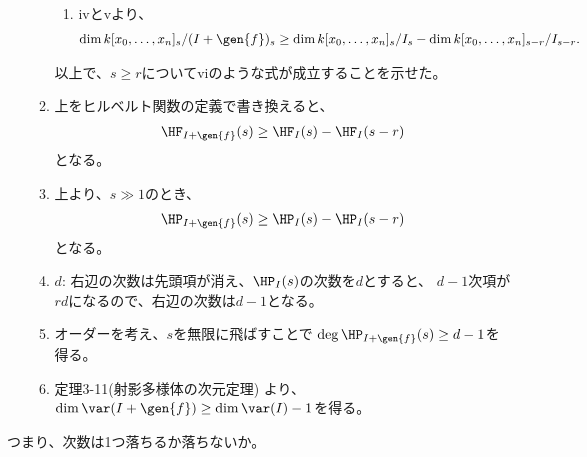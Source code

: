 \begin{myproof}
\begin{enumerate}
\begin{enumerate}
\begin{enumerate}
        \item
        ivとvより、
        \begin{align}
          \dim k[x_0,\dots,x_n]_s/(I+\gen{f})_s
          \ge
          \dim k[x_0,\dots,x_n]_s/I_s - \dim k[x_0,\dots,x_n]_{s-r}/I_{s-r}.
        \end{align}
      \end{enumerate}
      以上で、$s\ge r$についてviのような式が成立することを示せた。
      \item
      上をヒルベルト関数の定義で書き換えると、
      \begin{align}
        \HF_{I+\gen{f}}(s)\ge
        \HF_{I}(s) - \HF_{I}(s-r)
      \end{align}
      となる。
      \item
      上より、$s\gg 1$のとき、
      \begin{align}
        \HP_{I+\gen{f}}(s)
        \ge
        \HP_I(s) - \HP_I(s-r)
      \end{align}
      となる。
      \item
      $d$:
      右辺の次数は先頭項が消え、$\HP_I(s)$の次数を$d$とすると、
      $d-1$次項が$rd$になるので、右辺の次数は$d-1$となる。
      \item
      オーダーを考え、$s$を無限に飛ばすことで
      $\deg \HP_{I+\gen{f}}(s) \ge d-1$を得る。
      \item
      定理3-11(射影多様体の次元定理)
      より、$\dim \var(I+\gen{f}) \ge \dim \var(I)-1$を得る。
    \end{enumerate}
  \end{enumerate}
\end{myproof}
つまり、次数は1つ落ちるか落ちないか。

